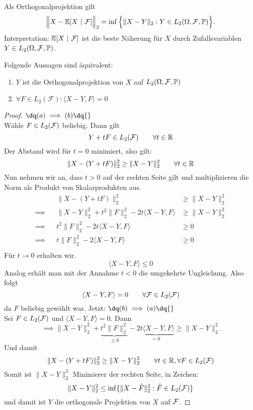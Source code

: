 \begin{bemerkung}
	Als Orthogonalprojektion gilt
	\begin{align*}
		\Big\Vert X-\E[X~|~\mathcal{F}]\Big\Vert_2=\inf\Big\lbrace\Vert X-Y\Vert_2:Y\in L_2(\Omega,\mathcal{F},\P)\Big\rbrace.
	\end{align*}
	Interpretation: $\E[X~|~\mathcal{F}]$ ist die beste Näherung für $X$ durch Zufallsvariablen\\ $Y\in L_2(\Omega,\mathcal{F},\P)$.
\end{bemerkung}

\begin{proposition}\label{Prop1.3}
	Folgende Aussagen sind äquivalent:
	\renewcommand{\labelenumi}{(\alph{enumi})}
	\begin{enumerate}
		\item $Y$ ist die Orthogonalprojektion von $X$ auf $L_2(\Omega,\mathcal{F},\P)$ 
		\item $\forall F\in L_2(\mathcal{F}):\langle X-Y,F\rangle=0$
	\end{enumerate}
\end{proposition}

\begin{proof}
	$\dq (a) \implies (b) \dq{}$ \\
	Wähle $F \in L_2(\F)$ beliebig. Dann gilt
	\[Y + tF \in L_2(\F) \qquad \forall t \in \R\]
	Der Abstand wird für $t=0$ minimiert, also gilt:
	\[\|X-(Y+tF)\|_2^2 \geq \|X-Y\|_2^2 \qquad \forall t \in \R\]
	Nun nehmen wir an, dass $t>0$ auf der rechten Seite gilt und multiplizieren die Norm als Produkt von Skalarprodukten aus.
	\begin{align*}
		&&\|X-(Y+tF)\|_2^2 &\geq \|X-Y\|_2^2 \\
		\implies	&&\|X-Y\|_2^2 + t^2\|F\|_2^2 - 2t\langle X-Y, F \rangle &\geq \|X-Y\|_2^2 \\
		\implies	&&t^2\|F\|_2^2 - 2t\langle X-Y, F \rangle &\geq 0 \\
		\implies	&&t\|F\|_2^2 - 2\langle X-Y, F \rangle &\geq 0 \\
	\end{align*}
	Für $t\rightarrow0$ erhalten wir.
		\[\langle X-Y, F \rangle \leq 0\]
	Analog erhält man mit der Annahme $t<0$ die umgekehrte Ungleichung.
	Also folgt
	\[\langle X-Y, F \rangle = 0 \qquad \forall \F \in L_2(\F)\]
	da $F$ beliebig gewählt war.\nl
	Jetzt: $\dq (b) \implies (a) \dq{}$\\
	Sei $F\in L_2(\F)$ und $\langle X-Y, F \rangle = 0$. Dann
	\[\implies \|X-Y\|_2^2 + \underbrace{t^2\|F\|_2^2}_{\geq 0} - \underbrace{2t\langle X-Y, F \rangle}_{=0} \geq \|X-Y\|_2^2\]
	Und damit 
	\[\|X-(Y+tF)\|_2^2 \geq \|X-Y\|_2^2 \qquad \forall t\in\R, \forall F\in L_2(\F)\]
	Somit ist $\|X-Y\|_2^2$ Minimierer der rechten Seite, in Zeichen:
	\[\|X-Y\|_2^2 \leq \inf\{\|X-\tilde{F}\|_2^2 : \tilde{F}\in L_2(\F)\}\]
	und damit ist $Y$ die orthogonale Projektion von $X$ auf $\F$.
\end{proof}

